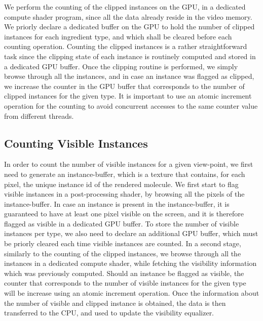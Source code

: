 We perform the counting of the clipped instances on the GPU, in a dedicated compute shader program, since all the data already reside in the video memory.
We priorly declare a dedicated buffer on the GPU to hold the number of clipped instances for each ingredient type, and which shall be cleared before each counting operation.
Counting the clipped instances is a rather straightforward task since the clipping state of each instance is routinely computed and stored in a dedicated GPU buffer.
Once the clipping routine is performed, we simply browse through all the instances, and in case an instance was flagged as clipped, we increase the counter in the GPU buffer that corresponds to the number of clipped instances for the given type.
It is important to use an atomic increment operation for the counting to avoid concurrent accesses to the same counter value from different threads. 

\subsection{Counting Visible Instances}

In order to count the number of visible instances for a given view-point, we first need to generate an instance-buffer, which is a texture that contains, for each pixel, the unique instance id of the rendered molecule.
We first start to flag visible instances in a post-processing shader, by browsing all the pixels of the instance-buffer.
In case an instance is present in the instance-buffer, it is guaranteed to have at least one pixel visible on the screen, and it is therefore flagged as visible in a dedicated GPU buffer.
To store the number of visible instances per type, we also need to declare an additional GPU buffer, which must be priorly cleared each time visible instances are counted.
In a second stage, similarly to the counting of the clipped instances, we browse through all the instances in a dedicated compute shader, while fetching the visibility information which was previously computed.
Should an instance be flagged as visible, the counter that corresponds to the number of visible instances for the given type will be increase using an atomic increment operation.
Once the information about the number of visible and clipped instance is obtained, the data is then transferred to the CPU, and used to update the visibility equalizer.

